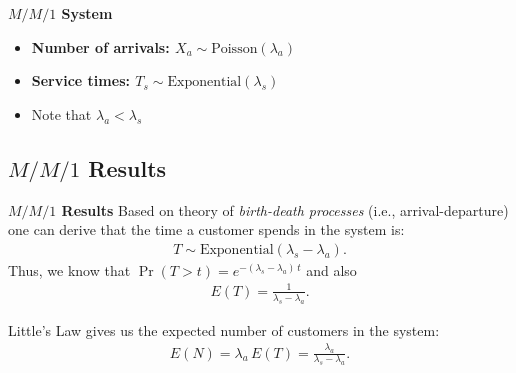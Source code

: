\documentclass[compress]{beamer}        %
\makeatletter
\newcommand{\tcb}{\textcolor{beamer@blendedblue}}
\makeatother
\begin{document}
\begin{frame}{\bf \tcb{$M / M / 1$ System}}
\begin{itemize}\itemsep0.5cm
\item {\bf Number of arrivals: {\boldmath$X_a \sim \text{Poisson}(\lambda_a)$}} \newline
     
\item {\bf Service times: {\boldmath$T_s \sim \text{Exponential}(\lambda_s)$}} \newline
     
     \qquad{}
\item Note that {\boldmath$\lambda_a < \lambda_s$}
\end{itemize}


\end{frame}



\subsection{$M / M / 1$ Results}
\begin{frame}{\bf \tcb{$M / M / 1$ Results}}
Based on theory of \emph{birth-death processes} (i.e., arrival-departure) one can derive that the time a customer spends in the system is:
\begin{align*}
\boxed{T \sim \text{Exponential}(\lambda_s - \lambda_a)}.
\end{align*}
Thus, we know that $\Pr(T > t) = e^{-(\lambda_s - \lambda_a)\,t}$ and also
\begin{align*}
\boxed{E(T) = \frac{1}{\lambda_s - \lambda_a}}.
\end{align*}

Little's Law gives us the expected number of customers in the system:
\begin{align*}
\boxed{E(N) = \lambda_a \, E(T) = \frac{\lambda_a}{\lambda_s - \lambda_a}}.
\end{align*}

\end{frame}
\end{document}
